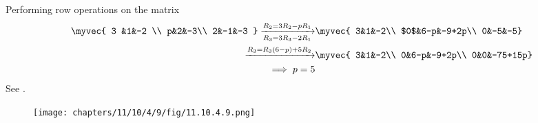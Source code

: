 Performing row operations
on the matrix
\begin{align*}  
\myvec{
    3 &1&-2 \\
     p&2&-3\\
     2&-1&-3
}
\xrightarrow[R_3=3R_3-2R_1]{R_2=3R_2-pR_1}&\myvec{
    3&1&-2\\
     $0$&6-p&-9+2p\\
     0&-5&-5}\\
 \xrightarrow{R_3=R_3(6-p)+5R_2}&\myvec{
    3&1&-2\\
     0&6-p&-9+2p\\
     0&0&-75+15p}
     \\
  \implies 
    p=5
\end{align*}
    See .
\begin{figure}[H]
    \centering
    \texttt{[image: chapters/11/10/4/9/fig/11.10.4.9.png]}
    \caption{}
    \label{fig:11.10.4.9}
\end{figure}

